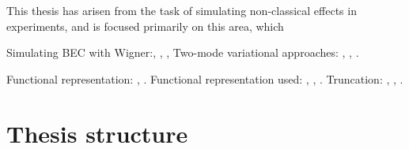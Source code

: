This thesis has arisen from the task of simulating non-classical effects in  experiments, and is focused primarily on this area, which

Simulating BEC with Wigner:\cite{Norrie2005}, \cite{Norrie2006}, \cite{Deuar2007},
Two-mode variational approaches: \cite{Sinatra2011}, \cite{Li2008}, \cite{Li2009}.

Functional representation: \cite{Graham1970}, \cite{Graham1970a}.
Functional representation used: \cite{Steel1998}, \cite{Isella2006}, \cite{Norrie2006a}.
Truncation: \cite{Drummond1993}, \cite{Steel1998}, \cite{Sinatra2002}.


\section{Thesis structure}



